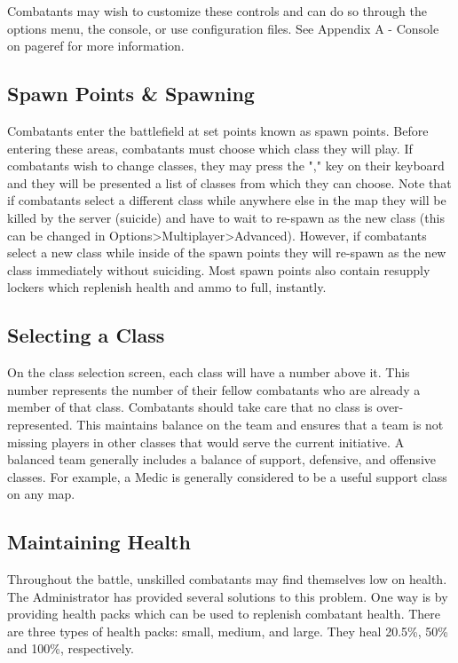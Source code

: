 Combatants may wish to customize these controls and can do so through the options menu, the console, or use configuration files. See Appendix A - Console on {{pageref}} for more information.

\subsection{Spawn Points \& Spawning}
Combatants enter the battlefield at set points known as spawn points. Before entering these areas, combatants must choose which class they will play. If combatants wish to change classes, they may press the "," key on their keyboard and they will be presented a list of classes from which they can choose. Note that if combatants select a different class while anywhere else in the map they will be killed by the server (suicide) and have to wait to re-spawn as the new class (this can be changed in Options>Multiplayer>Advanced). However, if combatants select a new class while inside of the spawn points they will re-spawn as the new class immediately without suiciding. Most spawn points also contain resupply lockers which replenish health and ammo to full, instantly.

\subsection{Selecting a Class}
On the class selection screen, each class will have a number above it. This number represents the number of their fellow combatants who are already a member of that class. Combatants should take care that no class is over-represented.  This maintains balance on the team and ensures that a team is not missing players in other classes that would serve the current initiative. A balanced team generally includes a balance of support, defensive, and offensive classes. For example, a Medic is generally considered to be a useful support class on any map.

\subsection{Maintaining Health}
Throughout the battle, unskilled combatants may find themselves low on health.  The Administrator has provided several solutions to this problem.  One way is by providing health packs which can be used to replenish combatant health.  There are three types of health packs: small, medium, and large.  They heal 20.5\%, 50\% and 100\%, respectively.

